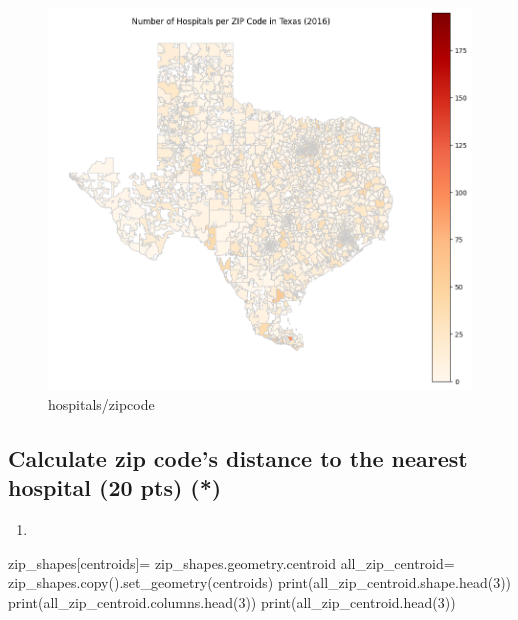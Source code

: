 \documentclass[
  letterpaper,
  DIV=11,
  numbers=noendperiod]{scrartcl}
\newenvironment{Shaded}{\begin{snugshade}}{\end{snugshade}}
\newcommand{\NormalTok}[1]{\textcolor[rgb]{0.00,0.23,0.31}{#1}}
\providecommand{\tightlist}{%
  \setlength{\itemsep}{0pt}\setlength{\parskip}{0pt}}\usepackage{longtable,booktabs,array}
\begin{document}
\begin{figure}[H]

{\centering \includegraphics[width=6.25in,height=\textheight,keepaspectratio]{s3q1.png}

}

\caption{hospitals/zipcode}

\end{figure}%

\subsection{Calculate zip code's distance to the nearest hospital (20
pts)
(*)}\label{calculate-zip-codes-distance-to-the-nearest-hospital-20-pts}

\begin{enumerate}
\def\labelenumi{\arabic{enumi}.}
\tightlist
\item
\end{enumerate}

\begin{Shaded}
\begin{Highlighting}[]
\NormalTok{zip\_shapes[\textquotesingle{}centroids\textquotesingle{}]= zip\_shapes.geometry.centroid}
\NormalTok{all\_zip\_centroid= zip\_shapes.copy().set\_geometry(\textquotesingle{}centroids\textquotesingle{})}
\NormalTok{print(all\_zip\_centroid.shape.head(3))}
\NormalTok{print(all\_zip\_centroid.columns.head(3))}
\NormalTok{print(all\_zip\_centroid.head(3))}
\end{Highlighting}
\end{Shaded}
\end{document}
